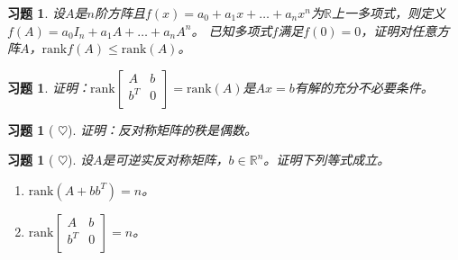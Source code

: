 \documentclass[UTF8]{ctexart}
\newcommand{\rank}{{\mathrm{rank}}}
\newtheorem{ex}[thm]{习题}
\begin{document}
\begin{ex}
	设$A$是$n$阶方阵且$f(x)=a_0+a_1x+\dots+a_nx^n$为$\mathbb{R}$上一多项式，则定义$f(A)=a_0I_n+a_1A+\dots+a_nA^n$。
	已知多项式$f$满足$f(0)=0$，证明对任意方阵$A$，$\rank f(A)\le \rank(A)$。
\end{ex}

\begin{ex}
	证明：$\rank \begin{bmatrix}
		A & b \\
		b^T & 0\\
	\end{bmatrix}=\rank(A)$是$Ax=b$有解的充分不必要条件。
\end{ex}



\begin{ex}[ $\heartsuit  $]
	证明：反对称矩阵的秩是偶数。
\end{ex}




\begin{ex}[ $\heartsuit  $]
	设$A$是可逆实反对称矩阵，$b\in \mathbb{R}^n$。证明下列等式成立。
	\begin{enumerate}
		\item $\rank(A+bb^T)=n$。
		\item $\rank\begin{bmatrix}
				A & b\\
				b^T & 0\\
		\end{bmatrix}=n$。
	\end{enumerate}
\end{ex}
\end{document}
